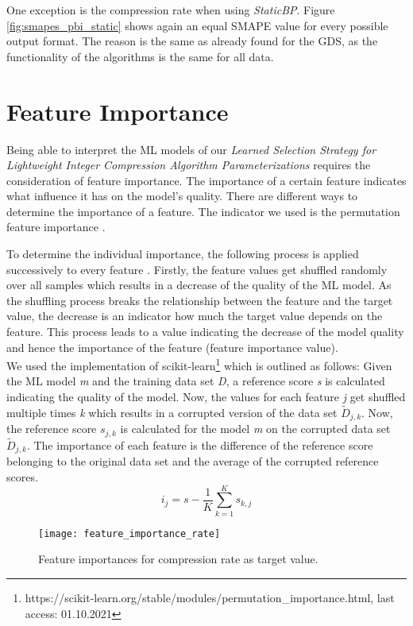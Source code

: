 One exception is the compression rate when using \emph{StaticBP}. Figure \ref{fig:smapes_pbi_static} shows again an equal SMAPE value for every possible output format. The reason is the same as already found for the GDS, as the functionality of the algorithms is the same for all data. 
\newpage
\section{Feature Importance}
Being able to interpret the ML models of our \emph{Learned Selection Strategy for Lightweight Integer Compression Algorithm Parameterizations} requires the consideration of feature importance. The importance of a certain feature indicates what influence it has on the model's quality. There are different ways to determine the importance of a feature. The indicator we used is the permutation feature importance \cite{Breiman2013}. 

To determine the individual importance, the following process is applied successively to every feature \cite{Breiman2013}. Firstly, the feature values get shuffled randomly over all samples which results in a decrease of the quality of the ML model. As the shuffling process breaks the relationship between the feature and the target value, the decrease is an indicator how much the target value depends on the feature. This process leads to a value indicating the decrease of the model quality and hence the importance of the feature (feature importance value).\\
We used the implementation of scikit-learn\footnote{https://scikit-learn.org/stable/modules/permutation\_importance.html, last access: 01.10.2021} which is outlined as follows:
Given the ML model \emph{m} and the training data set \emph{D}, a reference score \emph{s} is calculated indicating the quality of the model. Now, the values for each feature \emph{j} get shuffled multiple times \emph{k} which results in a corrupted version of the data set $\widetilde{D}_{j,k}$.
Now, the reference score $s_{j,k}$ is calculated for the model \emph{m} on the corrupted data set $\widetilde{D}_{j,k}$.
The importance of each feature is the difference of the reference score belonging to the original data set and the average of the corrupted reference scores.
\begin{equation}
    i_{j} = s - \frac{1}{K}\sum_{k=1}^{K} s_{k,j}
\end{equation}
\begin{figure}[h]
   \centering
   \texttt{[image: feature\_importance\_rate]}
   \caption{Feature importances for compression rate as target value.}
   \label{fig:feature_importances_compression_rate}
\end{figure}

